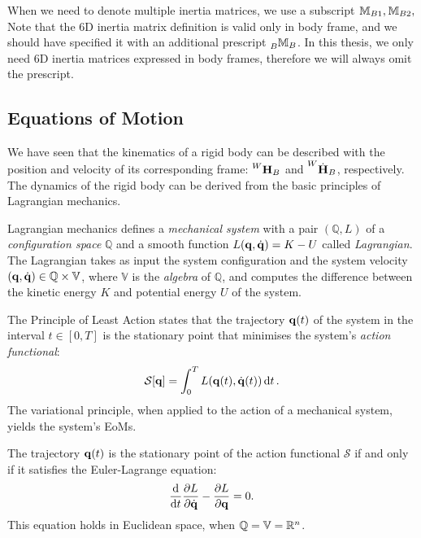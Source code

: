 \begin{remark*}
    When we need to denote multiple inertia matrices, we use a subscript $\masssix_{B1}, \masssix_{B2},$ \etc
    Note that the 6D inertia matrix definition is valid only in body frame, and we should have specified it with an additional prescript $\masssix[B]_B$.
    In this thesis, we only need 6D inertia matrices expressed in body frames, therefore we will always omit the prescript.
\end{remark*}

\subsection{Equations of Motion}
\label{sec:eom_rigid_body}

We have seen that the kinematics of a rigid body can be described with the position and velocity of its corresponding frame: $\homo[W]_B$ and $\homod[W]_B$, respectively.
The dynamics of the rigid body can be derived from the basic principles of Lagrangian mechanics.

\begin{definition*}
%
Lagrangian mechanics defines a \emph{mechanical system} with a pair $(\mathbb{Q}, L)$ of a \emph{configuration space} $\mathbb{Q}$ and a smooth function $L(\Qu, \Qud) = K - U$ called \emph{Lagrangian}.
The Lagrangian takes as input the system configuration and the system velocity $(\Qu, \Qud) \in \mathbb{Q} \times \mathbb{V}$,
where $\mathbb{V}$ is the \emph{algebra} of $\mathbb{Q}$, and computes the difference between the kinetic energy $K$ and potential energy $U$ of the system.
%
\end{definition*}

\begin{definition*}
%
The Principle of Least Action states that the trajectory $\Qu(t)$ of the system in the interval $t \in [0, T]$ is the stationary point that minimises the system's \emph{action functional}:
\begin{equation*}
    \mathcal{S}[\Qu] = \int_{0}^{T} L(\Qu(t), \Qud(t)) \dd{t}
    .
\end{equation*}
The variational principle, when applied to the action of a mechanical system, yields the system's \aclp{EoM}.
%
\end{definition*}

\begin{definition*}
\label{definition:euler_lagrange}
%
The trajectory $\Qu(t)$ is the stationary point of the action functional $\mathcal{S}$ if and only if it satisfies the Euler-Lagrange equation:
\begin{equation*}
    \dv{t} \pdv{L}{\Qud} - \pdv{L}{\Qu} = 0
    .
\end{equation*}
%
This equation holds in Euclidean space, when $\mathbb{Q} = \mathbb{V} = \realn^n$.
%
\end{definition*}

